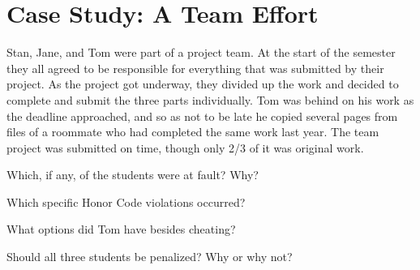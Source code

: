 \section*{Case Study: A Team Effort}

Stan, Jane, and Tom were part of a project team.
At the start of the semester they all agreed to be responsible for everything that was submitted by their project.
As the project got underway, they divided up the work and decided to complete and submit the three parts individually.
Tom was behind on his work as the deadline approached, and so as not to be late he copied several pages from files of a roommate who had completed the same work last year.
The team project was submitted on time, though only 2/3 of it was original work.




\Q Which, if any, of the students were at fault? Why?

\begin{answer}[6em]
\end{answer}


\Q Which specific Honor Code violations occurred?

\begin{answer}[6em]
\end{answer}


\Q What options did Tom have besides cheating?

\begin{answer}[6em]
\end{answer}


\Q Should all three students be penalized? Why or why not?

\begin{answer}[6em]
\end{answer}
